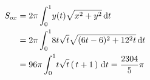 \documentclass[11pt]{amsbook}
\begin{document}
\begin{hSolution}
  \begin{equation}
    \begin{split}
      S_{ox} &= 2\pi \int_0^1 \! y(t)\sqrt{x^2+y^2} \, \mathrm{d} t \\
      &= 2\pi \int_0^1 \! 8t\sqrt{t} \sqrt{(6t-6)^2 +12^2t} \, \mathrm{d} t \\
      &= 96\pi \int_0^1 \! t\sqrt{t}  \left( \, t+1 \, \right)  \, \mathrm{d} t = \frac{2304}{5} \pi
    \end{split} 
  \end{equation}
\end{hSolution}
\end{document}
